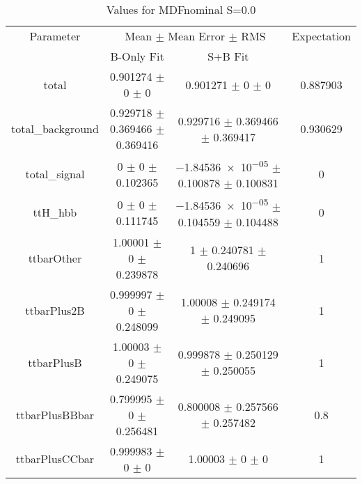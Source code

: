 \begin{table}
\centering
\caption{Values for MDFnominal S=0.0}
\begin{tabular}{cccc}
\toprule
Parameter & \multicolumn{2}{c}{Mean $\pm$ Mean Error $\pm$ RMS} & Expectation\\
 & B-Only Fit & S+B Fit & \\
\midrule
total & \num{0.901274} $\pm$ \num{0} $\pm$ \num{0} & \num{0.901271} $\pm$ \num{0} $\pm$ \num{0} & \num{0.887903}\\
total\_background & \num{0.929718} $\pm$ \num{0.369466} $\pm$ \num{0.369416} & \num{0.929716} $\pm$ \num{0.369466} $\pm$ \num{0.369417} & \num{0.930629}\\
total\_signal & \num{0} $\pm$ \num{0} $\pm$ \num{0.102365} & \num{-1.84536e-05} $\pm$ \num{0.100878} $\pm$ \num{0.100831} & \num{0}\\
ttH\_hbb & \num{0} $\pm$ \num{0} $\pm$ \num{0.111745} & \num{-1.84536e-05} $\pm$ \num{0.104559} $\pm$ \num{0.104488} & \num{0}\\
ttbarOther & \num{1.00001} $\pm$ \num{0} $\pm$ \num{0.239878} & \num{1} $\pm$ \num{0.240781} $\pm$ \num{0.240696} & \num{1}\\
ttbarPlus2B & \num{0.999997} $\pm$ \num{0} $\pm$ \num{0.248099} & \num{1.00008} $\pm$ \num{0.249174} $\pm$ \num{0.249095} & \num{1}\\
ttbarPlusB & \num{1.00003} $\pm$ \num{0} $\pm$ \num{0.249075} & \num{0.999878} $\pm$ \num{0.250129} $\pm$ \num{0.250055} & \num{1}\\
ttbarPlusBBbar & \num{0.799995} $\pm$ \num{0} $\pm$ \num{0.256481} & \num{0.800008} $\pm$ \num{0.257566} $\pm$ \num{0.257482} & \num{0.8}\\
ttbarPlusCCbar & \num{0.999983} $\pm$ \num{0} $\pm$ \num{0} & \num{1.00003} $\pm$ \num{0} $\pm$ \num{0} & \num{1}\\
\bottomrule
\end{tabular}
\end{table}